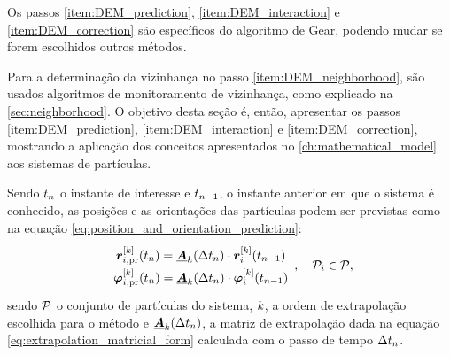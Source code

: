 Os passos \ref{item:DEM_prediction}, \ref{item:DEM_interaction} e \ref{item:DEM_correction} são específicos do algoritmo de Gear, podendo mudar se forem escolhidos outros métodos.

Para a determinação da vizinhança no passo \ref{item:DEM_neighborhood}, são usados algoritmos de monitoramento de vizinhança, como explicado na \autoref{sec:neighborhood}. O objetivo desta seção é, então, apresentar os passos \ref{item:DEM_prediction}, \ref{item:DEM_interaction} e \ref{item:DEM_correction}, mostrando a aplicação dos conceitos apresentados no \autoref{ch:mathematical_model} aos sistemas de partículas.


Sendo \(\instant[n]\) o instante de interesse e \(\instant[n-1]\), o instante anterior em que o sistema é conhecido, as posições e as orientações das partículas podem ser previstas como na equação \eqref{eq:position_and_orientation_prediction}:
\begin{equation*}
	\def\arraystretch{1.5}
	\begin{array}{c}
		\drvec{\taylorOrder}{\positionipr}\pqty{\instant[n]} = \extrapolationMatrix{\taylorOrder}[\Dt[n]]\cdot\drvec{\taylorOrder}{\positioni}\pqty{\instant[n-1]} \\
		\drvec{\taylorOrder}{\orientationipr}\pqty{\instant[n]} = \extrapolationMatrix{\taylorOrder}[\Dt[n]]\cdot\drvec{\taylorOrder}{\orientationi}\pqty{\instant[n-1]} \\
	\end{array}, \quad \particlei \in \particleSet,
\end{equation*}
sendo \(\particleSet\) o conjunto de partículas do sistema, \(\taylorOrder\), a ordem de extrapolação escolhida para o método e \(\extrapolationMatrix{\taylorOrder}[\Dt[n]]\), a matriz de extrapolação dada na equação \eqref{eq:extrapolation_matricial_form} calculada com o passo de tempo \(\Dt[n]\).

